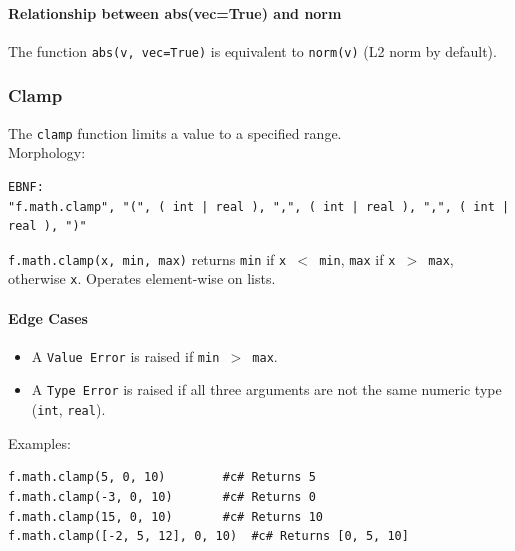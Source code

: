\paragraph{Relationship between abs(vec=True) and norm}
The function \texttt{abs(v, vec=True)} is equivalent to \texttt{norm(v)} (L2 norm by default).

\subsubsection{Clamp}
The \texttt{clamp} function limits a value to a specified range.\\
Morphology:
\begin{verbatim}
EBNF:
"f.math.clamp", "(", ( int | real ), ",", ( int | real ), ",", ( int | real ), ")"
\end{verbatim}
\texttt{f.math.clamp(x, min, max)} returns \texttt{min} if \texttt{x $<$ min}, \texttt{max} if \texttt{x $>$ max}, otherwise \texttt{x}.
Operates element-wise on lists.\\
\paragraph{Edge Cases}
\begin{itemize}
\item A \texttt{Value Error} is raised if \texttt{min $>$ max}.
\item A \texttt{Type Error} is raised if all three arguments are not the same numeric type (\texttt{int}, \texttt{real}).
\end{itemize}
Examples:
\begin{verbatim}
f.math.clamp(5, 0, 10)        #c# Returns 5
f.math.clamp(-3, 0, 10)       #c# Returns 0
f.math.clamp(15, 0, 10)       #c# Returns 10
f.math.clamp([-2, 5, 12], 0, 10)  #c# Returns [0, 5, 10]
\end{verbatim}

